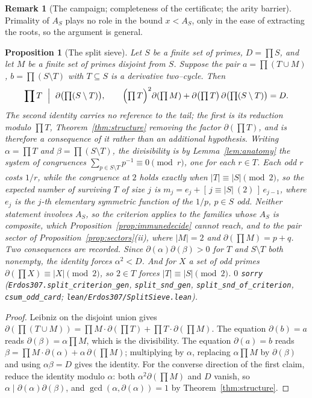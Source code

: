 \documentclass[11pt]{article}
\newtheorem{proposition}[theorem]{Proposition}
\theoremstyle{definition}
\newtheorem{remark}[theorem]{Remark}
\begin{document}
\begin{remark}[The campaign; completeness of the certificate; the arity barrier]
Primality of $A_S$ plays no role in the bound $x<A_S$, only in the ease of extracting the roots, so
the argument is general.

\begin{proposition}[The split sieve]\label{prop:splitsieve}
Let $S$ be a finite set of primes, $D=\prod S$, and let $M$ be a finite set of primes disjoint from
$S$. Suppose the pair $a=\prod(T\cup M)$, $b=\prod(S\setminus T)$ with $T\subseteq S$ is a
derivative two--cycle. Then
\[ \prod T\ \Bigm|\ \partial\bigl(\textstyle\prod(S\setminus T)\bigr),
   \qquad
   \Bigl(\textstyle\prod T\Bigr)^{2}\partial(\textstyle\prod M)
   +\partial\bigl(\textstyle\prod T\bigr)\,\partial\bigl(\textstyle\prod(S\setminus T)\bigr)=D . \]
The second identity carries no reference to the tail; the first is its reduction modulo $\prod T$,
Theorem~\ref{thm:structure} removing the factor $\partial(\prod T)$, and is therefore a consequence
of it rather than an additional hypothesis. Writing $\alpha=\prod T$ and $\beta=\prod(S\setminus T)$,
the divisibility is by Lemma~\ref{lem:anatomy} the system of congruences
$\sum_{p\in S\setminus T}p^{-1}\equiv0\pmod r$, one for each $r\in T$. Each odd $r$ costs $1/r$, while the
congruence at $2$ holds exactly when $|T|\equiv|S|\pmod 2$, so the expected number of surviving $T$ of size $j$ is
$m_j=e_j+[\,j\equiv|S|\ (2)\,]\,e_{j-1}$, where $e_j$ is the $j$-th elementary symmetric function of the $1/p$,
$p\in S$ odd. Neither statement involves $A_S$, so the
criterion applies to the families whose $A_S$ is composite, which
Proposition~\ref{prop:immunedecide} cannot reach, and to the pair sector of
Proposition~\ref{prop:sectors}(ii), where $|M|=2$ and $\partial(\prod M)=p+q$. Two consequences are
recorded. Since $\partial(\alpha)\partial(\beta)>0$ for $T$ and $S\setminus T$ both nonempty, the
identity forces $\alpha^{2}<D$. And for $X$ a set of odd primes $\partial(\prod X)\equiv|X|\pmod2$,
so $2\in T$ forces $|T|\equiv|S|\pmod2$. $0$ \texttt{sorry}
\textup{(\texttt{Erdos307.split\_criterion\_gen}, \texttt{split\_snd\_gen},
\texttt{split\_snd\_of\_criterion}, \texttt{csum\_odd\_card};
\texttt{lean/Erdos307/SplitSieve.lean})}.
\end{proposition}
\begin{proof}
Leibniz on the disjoint union gives $\partial(\prod(T\cup M))=\prod M\cdot\partial(\prod T)
+\prod T\cdot\partial(\prod M)$. The equation $\partial(b)=a$ reads
$\partial(\beta)=\alpha\prod M$, which is the divisibility. The equation $\partial(a)=b$ reads
$\beta=\prod M\cdot\partial(\alpha)+\alpha\,\partial(\prod M)$; multiplying by $\alpha$, replacing
$\alpha\prod M$ by $\partial(\beta)$ and using $\alpha\beta=D$ gives the identity. For the converse
direction of the first claim, reduce the identity modulo $\alpha$: both $\alpha^{2}\partial(\prod M)$
and $D$ vanish, so $\alpha\mid\partial(\alpha)\partial(\beta)$, and
$\gcd(\alpha,\partial(\alpha))=1$ by Theorem~\ref{thm:structure}.
\end{proof}


\end{remark}
\end{document}
